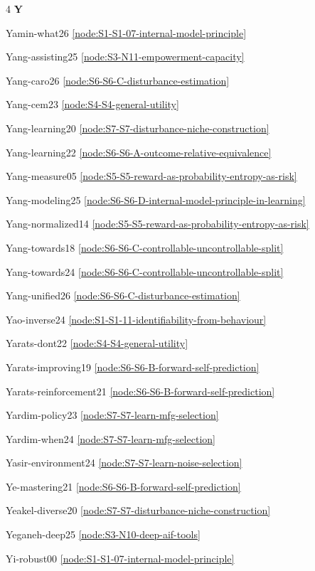 \documentclass[10pt]{article}
\begin{document}
{\begin{multicols}{4}
\smallskip\textbf{Y}\par
Yamin-what26 \hfill \ref{node:S1-S1-07-internal-model-principle}\par
Yang-assisting25 \hfill \ref{node:S3-N11-empowerment-capacity}\par
Yang-caro26 \hfill \ref{node:S6-S6-C-disturbance-estimation}\par
Yang-cem23 \hfill \ref{node:S4-S4-general-utility}\par
Yang-learning20 \hfill \ref{node:S7-S7-disturbance-niche-construction}\par
Yang-learning22 \hfill \ref{node:S6-S6-A-outcome-relative-equivalence}\par
Yang-measure05 \hfill \ref{node:S5-S5-reward-as-probability-entropy-as-risk}\par
Yang-modeling25 \hfill \ref{node:S6-S6-D-internal-model-principle-in-learning}\par
Yang-normalized14 \hfill \ref{node:S5-S5-reward-as-probability-entropy-as-risk}\par
Yang-towards18 \hfill \ref{node:S6-S6-C-controllable-uncontrollable-split}\par
Yang-towards24 \hfill \ref{node:S6-S6-C-controllable-uncontrollable-split}\par
Yang-unified26 \hfill \ref{node:S6-S6-C-disturbance-estimation}\par
Yao-inverse24 \hfill \ref{node:S1-S1-11-identifiability-from-behaviour}\par
Yarats-dont22 \hfill \ref{node:S4-S4-general-utility}\par
Yarats-improving19 \hfill \ref{node:S6-S6-B-forward-self-prediction}\par
Yarats-reinforcement21 \hfill \ref{node:S6-S6-B-forward-self-prediction}\par
Yardim-policy23 \hfill \ref{node:S7-S7-learn-mfg-selection}\par
Yardim-when24 \hfill \ref{node:S7-S7-learn-mfg-selection}\par
Yasir-environment24 \hfill \ref{node:S7-S7-learn-noise-selection}\par
Ye-mastering21 \hfill \ref{node:S6-S6-B-forward-self-prediction}\par
Yeakel-diverse20 \hfill \ref{node:S7-S7-disturbance-niche-construction}\par
Yeganeh-deep25 \hfill \ref{node:S3-N10-deep-aif-tools}\par
Yi-robust00 \hfill \ref{node:S1-S1-07-internal-model-principle}\par

\end{multicols}}
\end{document}
